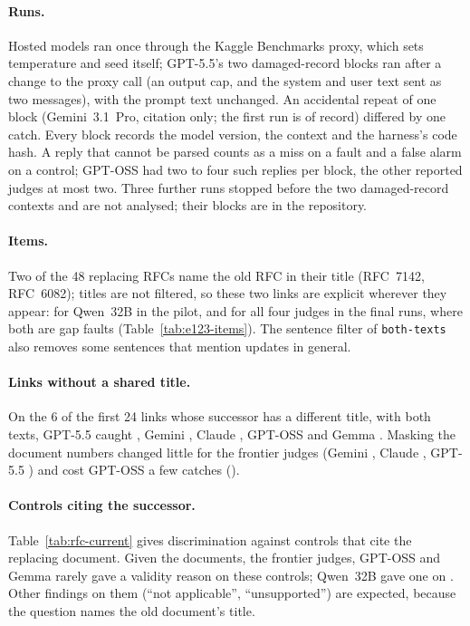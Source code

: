 \paragraph{Runs.} Hosted models ran once through the Kaggle Benchmarks proxy, which sets temperature and seed itself;
GPT-5.5's two damaged-record blocks ran after a change to the proxy call (an output cap, and the system and user text
sent as two messages), with the prompt text unchanged. An accidental repeat of one block (Gemini~3.1~Pro, citation only;
the first run is of record) differed by one catch. Every block records the model version, the context and the
harness's code hash. A reply that cannot be parsed counts as a miss on a fault and a false alarm on a control; GPT-OSS
had two to four such replies per block, the other reported judges at most two. Three further runs stopped before the
two damaged-record contexts and are not analysed; their blocks are in the repository.

\paragraph{Items.} Two of the 48 replacing RFCs name the old RFC in their title (RFC~7142, RFC~6082); titles are not
filtered, so these two links are explicit wherever they appear: for Qwen~32B in the pilot, and for all four judges
in the final runs, where both are gap faults (Table~\ref{tab:e123-items}). The sentence filter of
\texttt{both-texts} also removes some sentences that mention updates in general.

\paragraph{Links without a shared title.} On the 6 of the first 24 links whose successor has a different title, with
both texts, GPT-5.5 caught \RfcTitleDifferentBothTextsGPTFiveFive, Gemini \RfcTitleDifferentBothTextsGeminiThreeOnePro,
Claude \RfcTitleDifferentBothTextsClaudeOpusFourFive, GPT-OSS \RfcTitleDifferentBothTextsGPTOSSOneTwoZeroB{} and Gemma
\RfcTitleDifferentBothTextsGemmaFourTwoSixB. Masking the document numbers changed little for the frontier judges
(Gemini \RfcCatchBothMaskedGeminiThreeOnePro, Claude \RfcCatchBothMaskedClaudeOpusFourFive, GPT-5.5
\RfcCatchBothMaskedGPTFiveFive) and cost GPT-OSS a few catches (\RfcCatchBothMaskedGPTOSSOneTwoZeroB).

\paragraph{Controls citing the successor.} Table~\ref{tab:rfc-current} gives discrimination against controls that cite
the replacing document. Given the documents, the frontier judges, GPT-OSS and Gemma rarely gave a validity reason on
these controls; Qwen~32B gave one on \RfcFABothTextsQwenThreeTwoB. Other findings on them (``not applicable'',
``unsupported'') are expected, because the question names the old document's title.

